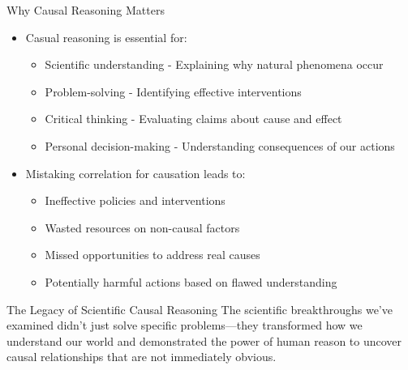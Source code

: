 \documentclass{beamer}
\begin{document}
\begin{frame}{Why Causal Reasoning Matters}
    \begin{itemize}
        \item Casual reasoning is essential for:
            \begin{itemize}
                \item Scientific understanding - Explaining why natural phenomena occur
                \item Problem-solving - Identifying effective interventions
                \item Critical thinking - Evaluating claims about cause and effect
                \item Personal decision-making - Understanding consequences of our actions
            \end{itemize}
        \item Mistaking correlation for causation leads to:
            \begin{itemize}
                \item Ineffective policies and interventions
                \item Wasted resources on non-causal factors
                \item Missed opportunities to address real causes
                \item Potentially harmful actions based on flawed understanding
            \end{itemize}
    \end{itemize}
    
    \begin{alertblock}{The Legacy of Scientific Causal Reasoning}
        The scientific breakthroughs we've examined didn't just solve specific problems—they transformed how we understand our world and demonstrated the power of human reason to uncover causal relationships that are not immediately obvious.
    \end{alertblock}
\end{frame}
\end{document}
